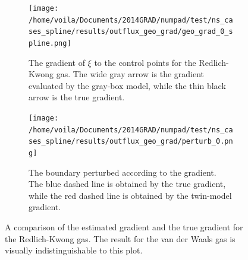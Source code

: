 \begin{figure}[htbp]\begin{center}
    \begin{subfigure}[t]{.45\textwidth}
        \centering
        \texttt{[image: /home/voila/Documents/2014GRAD/numpad/test/ns\_cases\_spline/results/outflux\_geo\_grad/geo\_grad\_0\_spline.png]}
        \caption{
        The gradient of $\xi$ to the control points for the 
        Redlich-Kwong gas. 
        The wide gray arrow is the gradient evaluated by the gray-box model, while
        the thin black arrow is the true gradient.}
        \label{fig: geo grad}
    \end{subfigure}
    \hspace{.5cm}
    \begin{subfigure}[t]{.45\textwidth}
        \centering
        \texttt{[image: /home/voila/Documents/2014GRAD/numpad/test/ns\_cases\_spline/results/outflux\_geo\_grad/perturb\_0.png]}
        \caption{
        The boundary perturbed according to the gradient. 
        The blue dashed line is obtained by the true gradient, while the
        red dashed line is obtained by the twin-model gradient.
        }
        \label{fig: geo grad perturb}
    \end{subfigure}
    \caption{A comparison of the estimated gradient and the true gradient for the Redlich-Kwong gas.
             The result for the van der Waals gas is visually indistinguishable to this plot.}
    \label{fig: geo grad all}
\end{center}\end{figure}

